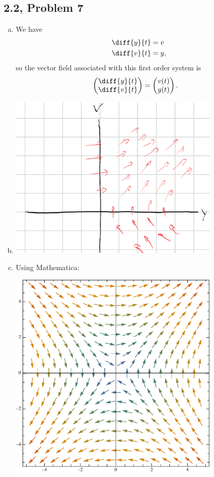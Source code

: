 \documentclass[10pt]{mypackage}
\begin{document}
\subsection{2.2, Problem 7}%
\begin{enumerate}[(a)]
  \item We have
    \begin{align*}
      \diff{y}{t} &= v\\
      \diff{v}{t} &= y,
    \end{align*}
    so the vector field associated with this first order system is
    \begin{align*}
      \begin{pmatrix}\diff{y}{t}\\\diff{v}{t}\end{pmatrix} &= \begin{pmatrix}v(t)\\y(t)\end{pmatrix}.
    \end{align*}
  \item \hfill
    \begin{center}
      \includegraphics[width=10cm]{images/2_2_7b.png}
    \end{center}
  \item Using Mathematica:
    \begin{center}
      \includegraphics[width=10cm]{images/2_2_7c.pdf}

\end{center}
\end{enumerate}
\end{document}
